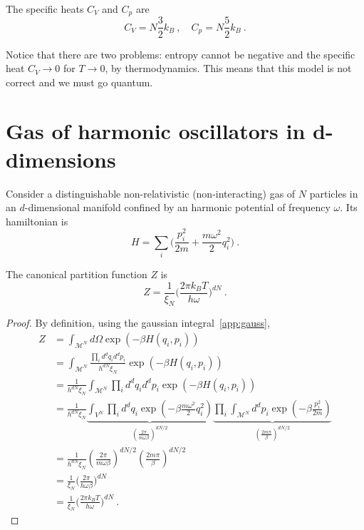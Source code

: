     The specific heats $C_V$ and $C_p$ are 
    \begin{equation*}
        C_V = N \frac{3}{2} k_B ~, \quad C_p = N \frac{5}{2} k_B ~. 
    \end{equation*}

    Notice that there are two problems: entropy cannot be negative and the specific heat $C_V \rightarrow 0$ for $T \rightarrow 0$, by thermodynamics. This means that this model is not correct and we must go quantum.
    
\section{Gas of harmonic oscillators in d-dimensions}

    Consider a distinguishable non-relativistic (non-interacting) gas of $N$ particles in an $d$-dimensional manifold confined by an harmonic potential of frequency $\omega$. Its hamiltonian is 
    \begin{equation*}
        H = \sum_i \Big ( \frac{p^2_i}{2m} + \frac{m \omega^2}{2} q_i^2 \Big ) ~.
    \end{equation*}

    The canonical partition function $Z$ is 
    \begin{equation*}
        Z = \frac{1}{\xi_N} \Big (\frac{2 \pi k_B T}{h \omega})^{dN} ~.
    \end{equation*}
    \begin{proof}
        By definition, using the gaussian integral~\eqref{app:gauss},
        \begin{equation*}
        \begin{aligned}
            Z & = \int_{\mathcal M^N} d\Omega \exp(- \beta H (q_i, p_i)) \\ & = \int_{\mathcal M^N} \frac{\prod_i d^d q_i d^d p_i}{h^{dN} \xi_N} \exp(- \beta H (q_i, p_i)) \\ & = \frac{1}{h^{dN} \xi_N} \int_{\mathcal M^N} \prod_i d^d q_i d^d p_i \exp(- \beta H (q_i, p_i)) \\ & = \frac{1}{h^{dN} \xi_N} \underbrace{\int_{ V^N} \prod_i d^d q_i \exp(- \beta \frac{m \omega^2}{2} q_i^2)}_{(\frac{2 \pi}{m \omega \beta})^{dN/2}} \underbrace{\prod_i \int_{\mathcal M^N} d^d p_i \exp(- \beta \frac{p^2_i}{2m})}_{(\frac{2 m \pi}{\beta})^{dN/2}} \\ & = \frac{1}{h^{dN} \xi_N} (\frac{2 \pi}{m \omega \beta})^{dN/2} (\frac{2 m \pi}{\beta})^{dN/2} \\ & = \frac{1}{\xi_N} \Big (\frac{2\pi}{h \omega \beta} \Big )^{dN} \\ & = \frac{1}{\xi_N} \Big (\frac{2 \pi k_B T}{h \omega} \Big )^{dN} ~.
        \end{aligned}
        \end{equation*}
    \end{proof}

